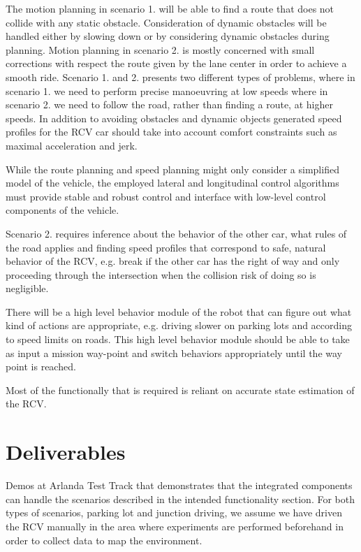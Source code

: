 \documentclass[11pt,a4paper]{article}
\begin{document}
The motion planning in scenario 1. will be able to find a
route that does not collide with any static obstacle.  Consideration
of dynamic obstacles will be handled either by slowing down or by
considering dynamic obstacles during planning. Motion planning in
scenario 2.  is mostly concerned with small corrections with respect
the route given by the lane center in order to achieve a smooth
ride. Scenario 1. and 2. presents two different types of problems,
where in scenario 1. we need to perform precise manoeuvring at low
speeds where in scenario 2. we need to follow the road, rather than
finding a route, at higher speeds. In addition to avoiding obstacles
and dynamic objects generated speed profiles for the RCV car should
take into account comfort constraints such as maximal acceleration and
jerk.

While the route planning and speed planning might only consider a
simplified model of the vehicle, the employed lateral and longitudinal
control algorithms must provide stable and robust control and interface
with low-level control components of the vehicle.

Scenario 2. requires inference about the behavior of the other car,
what rules of the road applies and finding speed profiles that
correspond to safe, natural behavior of the RCV, e.g. break if the
other car has the right of way and only proceeding through the
intersection when the collision risk of doing so is negligible.

There will be a high level behavior module of the robot that
can figure out what kind of actions are appropriate, e.g. driving
slower on parking lots and according to speed limits on roads. This
high level behavior module should be able to take as input a mission
way-point and switch behaviors appropriately until the way point is
reached.

Most of the functionally that is required is reliant on accurate
state estimation of the RCV.

\section{Deliverables}

Demos at Arlanda Test Track that demonstrates that the integrated
components can handle the scenarios described in the intended
functionality section. For both types of scenarios, parking lot and junction driving, we assume we have driven the RCV manually
in the area where experiments are performed beforehand in order to
collect data to map the environment.
\end{document}

